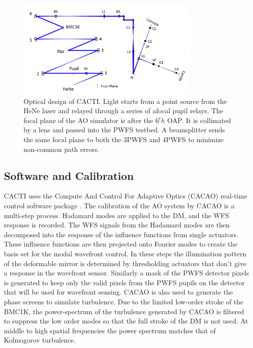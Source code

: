 \documentclass[12pt]{spieman}  %
\begin{document}
\begin{spacing}{2}
\begin{figure}
    \centering
    \includegraphics[width=0.8\textwidth]{CACTIzemax.png}
    \caption{Optical design of CACTI. Light starts from a point source from the HeNe laser and relayed through a series of afocal pupil relays. The focal plane of the AO simulator is after the 6${^th}$ OAP. It is collimated by a lens and passed into the PWFS testbed. A beamsplitter sends the same focal plane to both the 3PWFS and 4PWFS to minimize non-common path errors.}
    \label{fig:CACTIZemax}
\end{figure}

\subsection{Software and Calibration}

CACTI uses the Compute And Control For Adaptive Optics (CACAO) real-time control software package \cite{guyon2018compute}. The calibration of the AO system by CACAO is a multi-step process. Hadamard modes are applied to the DM, and the WFS response is recorded. The WFS signals from the Hadamard modes are then decomposed into the response of the influence functions from single actuators. These influence functions are then projected onto Fourier modes to create the basis set for the modal wavefront control. In these steps the illumination pattern of the deformable mirror is determined by thresholding actuators that don't give a response in the wavefront sensor. Similarly a mask of the PWFS detector pixels is generated to keep only the valid pixels from the PWFS pupils on the detector that will be used for wavefront sensing. CACAO is also used to generate the phase screens to simulate turbulence. Due to the limited low-order stroke of the BMC1K, the power-spectrum of the turbulence generated by CACAO is filtered to suppress the low order modes so that the full stroke of the DM is not used. At middle to high spatial frequencies the power spectrum matches that of Kolmogorov turbulence. 



\end{spacing}
\end{document}
